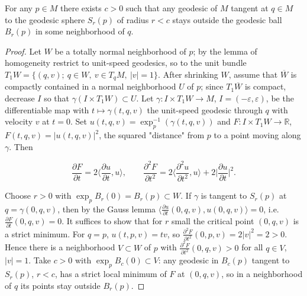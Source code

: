 \begin{lemma}
  \label{lem:dc-ch3-4-1}


  For any $p\in M$ there exists $c>0$ such that any geodesic of $M$ tangent at
  $q\in M$ to the geodesic sphere $S_r(p)$ of radius $r<c$ stays outside the
  geodesic ball $B_r(p)$ in some neighborhood of $q$.
\end{lemma}
\begin{proof}
  \sketch

  Let $W$ be a totally normal neighborhood of $p$; by the lemma of
  homogeneity restrict to unit-speed geodesics, so to the unit bundle
  $T_1W=\{(q,v);\ q\in W,\ v\in T_qM,\ |v|=1\}$. After shrinking $W$, assume that
  $\overline{W}$ is compactly contained in a normal neighborhood $U$ of $p$; since
  $T_1\overline{W}$ is compact, decrease $I$ so that
  $\gamma(I\times T_1W)\subset U$. Let
  $\gamma:I\times T_1W\to M$, $I=(-\varepsilon,\varepsilon)$, be the differentiable
  map with $t\mapsto\gamma(t,q,v)$ the unit-speed geodesic through $q$ with velocity
  $v$ at $t=0$. Set $u(t,q,v)=\exp_p^{-1}(\gamma(t,q,v))$ and
  $F:I\times T_1W\to\mathbb{R}$, $F(t,q,v)=|u(t,q,v)|^2$, the squared "distance"
  from $p$ to a point moving along $\gamma$. Then

  $$
  \frac{\partial F}{\partial t}=2\Big\langle\frac{\partial u}{\partial t},u\Big\rangle,\qquad\frac{\partial^2 F}{\partial t^2}=2\Big\langle\frac{\partial^2 u}{\partial t^2},u\Big\rangle+2\Big|\frac{\partial u}{\partial t}\Big|^2.
  $$

  Choose $r>0$ with $\exp_p B_r(0)=B_r(p)\subset W$. If $\gamma$ is tangent to
  $S_r(p)$ at $q=\gamma(0,q,v)$, then by the Gauss lemma
  $\langle\frac{\partial u}{\partial t}(0,q,v),u(0,q,v)\rangle=0$, i.e.
  $\frac{\partial F}{\partial t}(0,q,v)=0$. It suffices to show that for $r$ small
  the critical point $(0,q,v)$ is a strict minimum. For $q=p$, $u(t,p,v)=tv$, so
  $\frac{\partial^2 F}{\partial t^2}(0,p,v)=2|v|^2=2>0$. Hence there is a
  neighborhood $V\subset W$ of $p$ with $\frac{\partial^2 F}{\partial t^2}(0,q,v)>0$
  for all $q\in V$, $|v|=1$. Take $c>0$ with $\exp_p B_c(0)\subset V$: any geodesic
  in $B_c(p)$ tangent to $S_r(p)$, $r<c$, has a strict local minimum of $F$ at
  $(0,q,v)$, so in a neighborhood of $q$ its points stay outside $B_r(p)$.
\end{proof}

